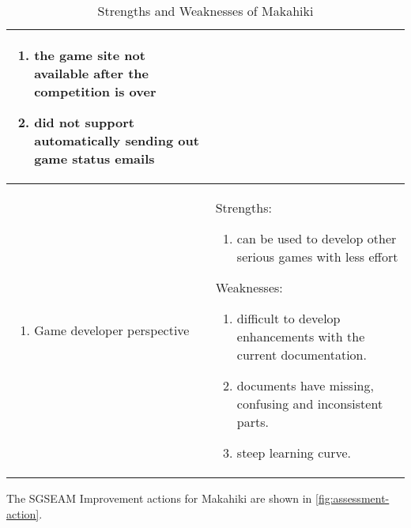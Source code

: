 \begin{table}[ht!]
\begin{tabular}{|P{0.15\columnwidth}|P{0.78\columnwidth}|}
\begin{enumerate}[nosep, leftmargin=*]
    \item the game site not available after the competition is over
    \item did not support automatically sending out game status emails 
    \end{enumerate}  \\
    \hline
    \begin{enumerate}[label={}, nosep, leftmargin=*]
    \item Game developer perspective
    \end{enumerate}
    & 
    Strengths:
    \begin{enumerate}[label={}, nosep, leftmargin=*]
    \item can be used to develop other serious games with less effort
    \end{enumerate} 
    Weaknesses:
    \begin{enumerate}[nosep, leftmargin=*]
    \item difficult to develop enhancements with the current documentation.
    \item documents have missing, confusing and inconsistent parts.
    \item steep learning curve. 
    \end{enumerate} \\
    \hline
  \end{tabular}
  \caption{Strengths and Weaknesses of Makahiki}
  \label{table:assessment-result}
\end{table}

\clearpage

The SGSEAM Improvement actions for Makahiki are shown in \autoref{fig:assessment-action}.

